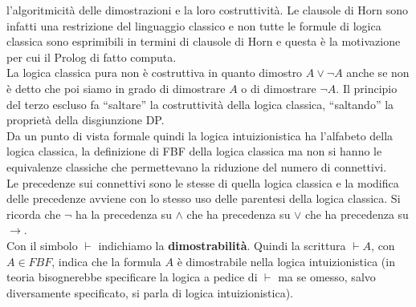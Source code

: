 \documentclass[a4paper,12pt, oneside]{book}
\begin{document}
l'algoritmicità delle dimostrazioni e la loro costruttività. Le clausole di Horn
sono infatti una restrizione del linguaggio classico e non tutte le formule di
logica classica sono esprimibili in termini di clausole di Horn e questa è la
motivazione per cui il Prolog di fatto computa.\\
La logica classica pura non è costruttiva in quanto dimostro $A\lor \neg A$
anche se non è detto che poi siamo in grado di dimostrare $A$ o di dimostrare
$\neg A$. Il principio del terzo escluso fa ``saltare'' la costruttività della
logica classica, ``saltando'' la proprietà della disgiunzione DP.\\
Da un punto di vista formale quindi la logica intuizionistica ha l'alfabeto
della logica classica, la definizione di FBF della logica classica ma non si
hanno le equivalenze classiche che permettevano la riduzione del numero di
connettivi.\\ 
Le precedenze sui connettivi sono le stesse di quella logica classica e la
modifica delle precedenze avviene con lo stesso uso delle parentesi della logica
classica. Si ricorda che $\neg$ ha la precedenza su $\land$ che ha precedenza su
$\lor$ che ha precedenza su $\to$.\\
Con il simbolo $\vdash$ indichiamo la \textbf{dimostrabilità}. Quindi la
scrittura $\vdash A$, con $A\in FBF$, indica che la formula $A$ è dimostrabile
nella logica intuizionistica (in teoria bisognerebbe specificare la logica
a pedice di $\vdash$ ma se omesso, salvo diversamente specificato, si parla di
logica intuizionistica).
\end{document}
